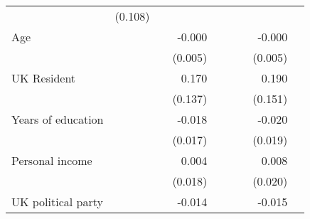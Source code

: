 \documentclass{article}
\begin{document}
\begin{table}[!h]
\begin{tabular}{lllllllll}
  \multicolumn{1}{l}{} &
  \multicolumn{1}{r}{(0.108)} &
  \multicolumn{1}{l}{} \\
\multicolumn{1}{l}{Age} &
  \multicolumn{1}{r}{} &
  \multicolumn{1}{l}{} &
  \multicolumn{1}{r}{-0.000} &
  \multicolumn{1}{l}{} &
  \multicolumn{1}{r}{} &
  \multicolumn{1}{l}{} &
  \multicolumn{1}{r}{-0.000} &
  \multicolumn{1}{l}{} \\
\multicolumn{1}{l}{} &
  \multicolumn{1}{r}{} &
  \multicolumn{1}{l}{} &
  \multicolumn{1}{r}{(0.005)} &
  \multicolumn{1}{l}{} &
  \multicolumn{1}{r}{} &
  \multicolumn{1}{l}{} &
  \multicolumn{1}{r}{(0.005)} &
  \multicolumn{1}{l}{} \\
\multicolumn{1}{l}{UK Resident} &
  \multicolumn{1}{r}{} &
  \multicolumn{1}{l}{} &
  \multicolumn{1}{r}{0.170} &
  \multicolumn{1}{l}{} &
  \multicolumn{1}{r}{} &
  \multicolumn{1}{l}{} &
  \multicolumn{1}{r}{0.190} &
  \multicolumn{1}{l}{} \\
\multicolumn{1}{l}{} &
  \multicolumn{1}{r}{} &
  \multicolumn{1}{l}{} &
  \multicolumn{1}{r}{(0.137)} &
  \multicolumn{1}{l}{} &
  \multicolumn{1}{r}{} &
  \multicolumn{1}{l}{} &
  \multicolumn{1}{r}{(0.151)} &
  \multicolumn{1}{l}{} \\
\multicolumn{1}{l}{Years of education} &
  \multicolumn{1}{r}{} &
  \multicolumn{1}{l}{} &
  \multicolumn{1}{r}{-0.018} &
  \multicolumn{1}{l}{} &
  \multicolumn{1}{r}{} &
  \multicolumn{1}{l}{} &
  \multicolumn{1}{r}{-0.020} &
  \multicolumn{1}{l}{} \\
\multicolumn{1}{l}{} &
  \multicolumn{1}{r}{} &
  \multicolumn{1}{l}{} &
  \multicolumn{1}{r}{(0.017)} &
  \multicolumn{1}{l}{} &
  \multicolumn{1}{r}{} &
  \multicolumn{1}{l}{} &
  \multicolumn{1}{r}{(0.019)} &
  \multicolumn{1}{l}{} \\
\multicolumn{1}{l}{Personal income} &
  \multicolumn{1}{r}{} &
  \multicolumn{1}{l}{} &
  \multicolumn{1}{r}{0.004} &
  \multicolumn{1}{l}{} &
  \multicolumn{1}{r}{} &
  \multicolumn{1}{l}{} &
  \multicolumn{1}{r}{0.008} &
  \multicolumn{1}{l}{} \\
\multicolumn{1}{l}{} &
  \multicolumn{1}{r}{} &
  \multicolumn{1}{l}{} &
  \multicolumn{1}{r}{(0.018)} &
  \multicolumn{1}{l}{} &
  \multicolumn{1}{r}{} &
  \multicolumn{1}{l}{} &
  \multicolumn{1}{r}{(0.020)} &
  \multicolumn{1}{l}{} \\
\multicolumn{1}{l}{UK political party} &
  \multicolumn{1}{r}{} &
  \multicolumn{1}{l}{} &
  \multicolumn{1}{r}{-0.014} &
  \multicolumn{1}{l}{} &
  \multicolumn{1}{r}{} &
  \multicolumn{1}{l}{} &
  \multicolumn{1}{r}{-0.015} &

\end{tabular}
\end{table}
\end{document}
